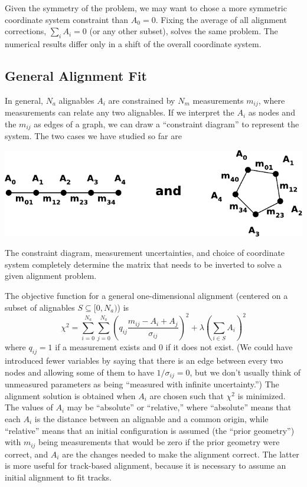 \documentclass[12pt]{article}
\begin{document}
Given the symmetry of the problem, we may want to chose a more
symmetric coordinate system constraint than $A_0 = 0$.  Fixing the
average of all alignment corrections, $\sum_i A_i = 0$ (or any other
subset), solves the same problem.  The numerical results differ only
in a shift of the overall coordinate system.

\subsection{General Alignment Fit}

\begin{minipage}{\linewidth}
In general, $N_a$ alignables $A_i$ are constrained by $N_m$
measurements $m_{ij}$, where measurements can relate any two
alignables.  If we interpret the $A_i$ as nodes and the $m_{ij}$ as
edges of a graph, we can draw a ``constraint diagram'' to represent
the system.  The two cases we have studied so far are
\begin{center}
\includegraphics[width=0.75\linewidth]{PLOTS/two_diagrams.pdf}
\end{center}
\end{minipage}
The constraint diagram, measurement uncertainties, and choice of
coordinate system completely determine the matrix that needs to be
inverted to solve a given alignment problem.

The objective function for a general one-dimensional alignment
(centered on a subset of alignables $S \subseteq [0, N_a)$) is
\begin{equation}
\chi^2 = \sum_{i=0}^{N_a} \sum_{j=0}^{N_a}
\left(q_{ij} \frac{m_{ij} - A_i + A_j}{\sigma_{ij}}\right)^2
+ \lambda \left(\sum_{i \in S} A_i \right)^2
\label{eqn:general_chi2}
\end{equation}
where $q_{ij} = 1$ if a measurement exists and $0$ if it does not
exist.  (We could have introduced fewer variables by saying that there
is an edge between every two nodes and allowing some of them to have
$1/\sigma_{ij} = 0$, but we don't usually think of unmeasured
parameters as being ``measured with infinite uncertainty.'')  The
alignment solution is obtained when $A_i$ are chosen such that
$\chi^2$ is minimized.  The values of $A_i$ may be ``absolute'' or
``relative,'' where ``absolute'' means that each $A_i$ is the distance
between an alignable and a common origin, while ``relative'' means
that an initial configuration is assumed (the ``prior geometry'') with
$m_{ij}$ being measurements that would be zero if the prior geometry
were correct, and $A_i$ are the changes needed to make the alignment
correct.  The latter is more useful for track-based alignment, because
it is necessary to assume an initial alignment to fit tracks.
\end{document}
